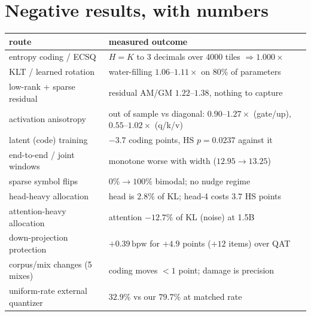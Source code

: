 \documentclass[11pt,a4paper]{article}
\newcommand{\bpw}{\,\mathrm{bpw}}
\begin{document}
\section{Negative results, with numbers}
\begin{table}[h]
\centering\footnotesize
\setlength{\tabcolsep}{4pt}
\begin{tabular}{@{}l p{}@{}}
\toprule
route & measured outcome\\
\midrule
entropy coding / ECSQ & $H=K$ to 3 decimals over 4000 tiles $\Rightarrow1.000\times$\\
KLT / learned rotation & water-filling $1.06$--$1.11\times$ on 80\% of parameters\\
low-rank + sparse residual & residual AM/GM $1.22$--$1.38$, nothing to capture\\
activation anisotropy & out of sample vs diagonal: $0.90$--$1.27\times$ (gate/up), $0.55$--$1.02\times$ (q/k/v)\\
latent (code) training & $-3.7$ coding points, HS $p=0.0237$ against it\\
end-to-end / joint windows & monotone worse with width ($12.95\to13.25$)\\
sparse symbol flips & $0\%\to100\%$ bimodal; no nudge regime\\
head-heavy allocation & head is $2.8\%$ of KL; head-4 costs $3.7$ HS points\\
attention-heavy allocation & attention $-12.7\%$ of KL (noise) at 1.5B\\
down-projection protection & $+0.39\bpw$ for $+4.9$ points ($+12$ items) over QAT\\
corpus/mix changes (5 mixes) & coding moves $<1$ point; damage is precision\\
uniform-rate external quantizer & $32.9\%$ vs our $79.7\%$ at matched rate\\
\bottomrule
\end{tabular}
\end{table}
\end{document}
